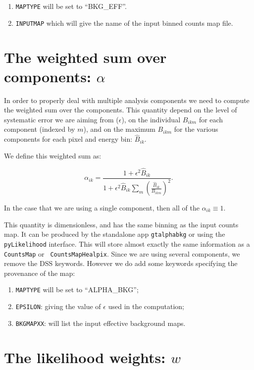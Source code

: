 \documentclass[preprint]{aastex}
\begin{document}
\begin{enumerate}
\item{{\tt MAPTYPE} will be set to ``BKG\_EFF''.}
\item{{\tt INPUTMAP} which will give the name of the input binned counts map
file.}
\end{enumerate}

\section{The weighted sum over components: $\alpha$}

In order to properly deal with multiple analysis components we need to
compute the weighted sum over the components.  This quantity depend on
the level of systematic error we are aiming from ($\epsilon$), on the
individual $B_{ikm}$ for each component (indexed by $m$), and on the
maximum $B_{ikm}$ for the various components for each pixel and energy
bin: $\hat{B}_{ik}$.

We define this weighted sum as:

\begin{equation}
\alpha_{ik} = \frac{1 + \epsilon^2 \hat{B}_{ik}}{1 + \epsilon^2 \hat{B}_{ik} \sum_{m} (\frac{\hat{B}_{ik}}{B_{ikm}})^2 }.
\end{equation}

\noindent In the case that we are using a single component, then all
of the $\alpha_{ik} \equiv 1$.

This quantity is dimensionless, and has the same binning as the input
counts map.  It can be produced by the standalone app {\tt gtalphabkg}
or using the {\tt pyLikelihood} interface.  This will store almost
exactly the same information as a {\tt CountsMap} or {\tt
  CountsMapHealpix}. Since we are using several components, we remove 
the DSS keywords.  However we do add some keywords specifying the
provenance of the map:

\begin{enumerate}
\item{{\tt MAPTYPE} will be set to ``ALPHA\_BKG'';}
\item{{\tt EPSILON}: giving the value of $\epsilon$ used in the computation;}
\item{{\tt BKGMAPXX}: will list the input effective background maps.}    
\end{enumerate}



\section{The likelihood weights: $w$}
\end{document}
